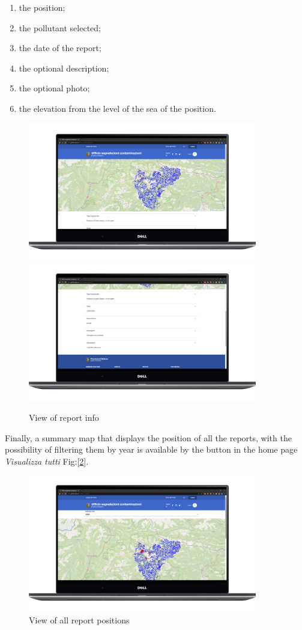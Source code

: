\begin{itemize}
    \begin{enumerate}
        \item the position;
        \item the pollutant selected;
        \item the date of the report;
        \item the optional description;
        \item the optional photo;
        \item the elevation from the level of the sea of the position.
    \end{enumerate}
    \begin{figure}[H] \centering \includegraphics[width=27em]{img/pos_rep.png} \includegraphics[width=27em]{img/dati_rep.png} \caption{View of report info}  \label{reportView} \end{figure}
    Finally, a summary map that displays the position of all the reports, with the possibility of filtering them by year is available by the button in the home page \textit{Visualizza tutti} Fig:[\ref{allPositions}].
    \begin{figure}[H]\centering \includegraphics[width=27em]{img/all_reports.png} \caption{View of all report positions} \label{allPositions}\end{figure}
    
\end{itemize}

